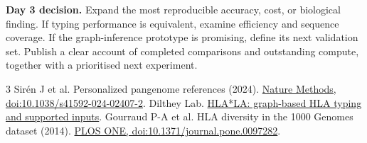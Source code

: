 \documentclass[11pt,a4paper]{article}
\begin{document}
\textbf{Day 3 decision.} Expand the most reproducible accuracy, cost, or biological
finding. If typing performance is equivalent, examine efficiency and sequence
coverage. If the graph-inference prototype is promising, define its next
validation set. Publish a clear account of completed comparisons and outstanding
compute, together with a prioritised next experiment.

\vspace{-0.5em}
\begin{thebibliography}{3}\small\setlength{\itemsep}{0pt}
 Sir\'en J et al. Personalized pangenome references (2024).
\href{https://doi.org/10.1038/s41592-024-02407-2}{Nature Methods, doi:10.1038/s41592-024-02407-2}.
 Dilthey Lab. \href{https://github.com/DiltheyLab/HLA-LA}{HLA*LA: graph-based HLA typing and supported inputs}.
 Gourraud P-A et al. HLA diversity in the 1000 Genomes dataset (2014).
\href{https://doi.org/10.1371/journal.pone.0097282}{PLOS ONE, doi:10.1371/journal.pone.0097282}.
\end{thebibliography}
\end{document}
